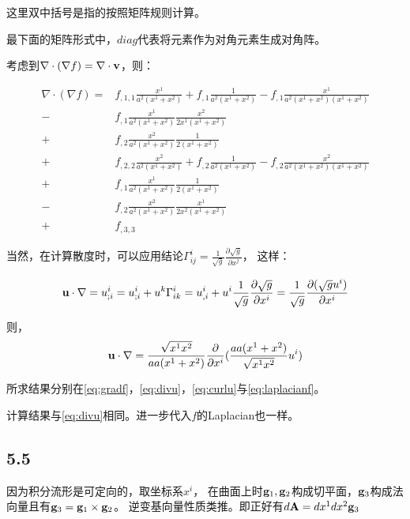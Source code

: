 \documentclass[UTF8,zihao=5]{ctexart}
\newcommand{\bm}[1]{{\mathbf{#1}}}
\newcommand*{\pd}[2]{\frac{\partial #1}{\partial #2}}
\begin{document}
这里双中括号是指的按照矩阵规则计算。

最下面的矩阵形式中，$diag$代表将元素作为对角元素生成对角阵。

考虑到$\nabla\cdot(\nabla f)=\nabla\cdot\vv$，则：

\begin{equation}
    \begin{aligned}
        \nabla\cdot(\nabla f)
        = &
        f_{,1,1}\frac{x^1}{a^2(x^1+x^2)} + f_{,1}\frac{1}{a^2(x^1+x^2)} -f_{,1}\frac{x^1}{a^2(x^1+x^2)(x^1+x^2)} \\
        - & f_{,1}\frac{x^1}{a^2(x^1+x^2)} \frac{x^2}{2x^1(x^1+x^2)}                                             \\
        + & f_{,2}\frac{x^2}{a^2(x^1+x^2)} \frac{1}{2(x^1+x^2)}                                                  \\
        + &
        f_{,2,2}\frac{x^2}{a^2(x^1+x^2)} + f_{,2}\frac{1}{a^2(x^1+x^2)}- f_{,2}\frac{x^2}{a^2(x^1+x^2)(x^1+x^2)} \\
        + & f_{,1}\frac{x^1}{a^2(x^1+x^2)} \frac{1}{2(x^1+x^2)}                                                  \\
        - & f_{,2}\frac{x^2}{a^2(x^1+x^2)} \frac{x^1}{2x^2(x^1+x^2)}                                             \\
        + &
        f_{,3,3}
    \end{aligned}
    \label{eq:laplacianf}
\end{equation}


当然，在计算散度时，可以应用结论$\Gamma^i_{ij}=\frac{1}{\sqrt{g}}\pd{\sqrt{g}}{x^j}$，
这样：

$$
    \uu\cdot\nb = u^i_{;i}=u^i_{;i} + u^k\Gamma^i_{ik}=
    u^i_{,i} + u^i\frac{1}{\sqrt{g}}\pd{\sqrt{g}}{x^i}
    =\frac{1}{\sqrt{g}}\pd{(\sqrt{g}u^i)}{x^i}
$$

则，
$$
    \uu\cdot\nb
    =
    \frac{\sqrt{x^1x^2}}{aa(x^1+x^2)}
    \pd{}{x^i}(\frac{aa(x^1+x^2)}{\sqrt{x^1x^2}}u^i)
$$

所求结果分别在\eqref{eq:gradf}，\eqref{eq:divu}，\eqref{eq:curlu}与\eqref{eq:laplacianf}。

计算结果与\eqref{eq:divu}相同。进一步代入$f$的Laplacian也一样。



\subsection*{5.5}

因为积分流形是可定向的，取坐标系$x^i$，
在曲面上时$\g_1,\g_2$构成切平面，$\g_3$构成法向量且有$\g_3 = \g_1\times\g_2$。
逆变基向量性质类推。即正好有$d\bm{A}=dx^1dx^2\g_3$
\end{document}
